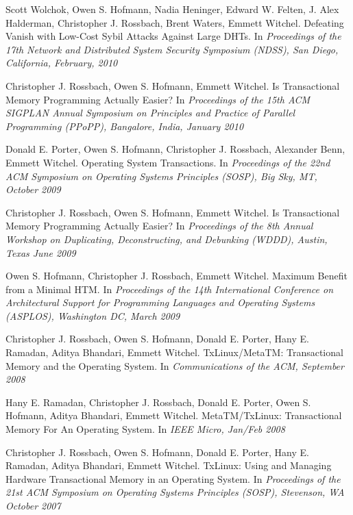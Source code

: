 \begin{bibsection}
\item Scott Wolchok, Owen S. Hofmann,  Nadia Heninger,  Edward W. Felten,
J. Alex Halderman, Christopher J. Rossbach, Brent Waters, Emmett Witchel.
Defeating Vanish with Low-Cost Sybil Attacks Against Large DHTs.
 In \emph{Proceedings of the 17th Network and Distributed System Security
Symposium (NDSS), San Diego, California, February, 2010}


\item Christopher J. Rossbach, Owen S. Hofmann, Emmett Witchel.
Is Transactional Memory Programming Actually Easier?
In \emph{Proceedings of the  15th ACM SIGPLAN Annual Symposium on
Principles and Practice of Parallel Programming (PPoPP), Bangalore, India,
January 2010} 
 
\item Donald E. Porter, Owen S. Hofmann, Christopher J. Rossbach, Alexander
Benn, Emmett Witchel.
Operating System Transactions.
In \emph{Proceedings of the 22nd ACM Symposium on Operating Systems
Principles (SOSP), Big Sky, MT, October 2009} 
 
\item Christopher J. Rossbach, Owen S. Hofmann, Emmett Witchel.
Is Transactional Memory Programming Actually Easier?
In \emph{Proceedings of the  8th Annual Workshop on Duplicating,
Deconstructing, and Debunking (WDDD), Austin, Texas June 2009} 
 
\item Owen S. Hofmann, Christopher J. Rossbach, Emmett Witchel.
Maximum Benefit from a Minimal HTM.
In \emph{Proceedings of the 14th International Conference on Architectural
Support for Programming Languages and Operating Systems (ASPLOS),
Washington DC, March 2009} 
 
\item Christopher J. Rossbach, Owen S. Hofmann, Donald E. Porter, Hany E.
Ramadan, Aditya Bhandari, Emmett Witchel.
TxLinux/MetaTM: Transactional Memory and the Operating System.
In \emph{Communications of the ACM, September 2008} 
 
\item Hany E. Ramadan, Christopher J. Rossbach, Donald E. Porter, Owen S.
Hofmann, Aditya Bhandari, Emmett Witchel.
MetaTM/TxLinux: Transactional Memory For An Operating System.
 In \emph{IEEE Micro, Jan/Feb 2008}
 
\item Christopher J. Rossbach, Owen S. Hofmann, Donald E. Porter, Hany E.
Ramadan, Aditya Bhandari, Emmett Witchel.
TxLinux: Using and Managing Hardware Transactional Memory in an
Operating System.
In \emph{Proceedings of the 21st ACM Symposium on Operating Systems
Principles (SOSP), Stevenson, WA October 2007} 
 

\end{bibsection}
